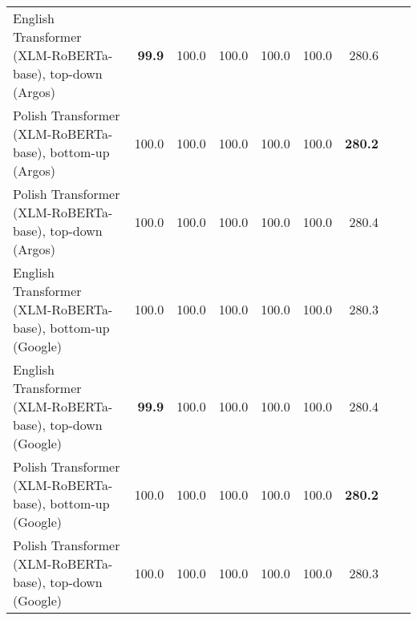 \begin{table}[ht!]
{\begin{tabular}{lrrrrrrrr}
  English Transformer (XLM-RoBERTa-base), top-down (Argos) & \textbf{99.9} & 100.0 & 100.0 & 100.0 & 100.0 & 280.6 \\ 
  Polish Transformer (XLM-RoBERTa-base), bottom-up (Argos) & 100.0 & 100.0 & 100.0 & 100.0 & 100.0 & \textbf{280.2} \\ 
  Polish Transformer (XLM-RoBERTa-base), top-down (Argos) & 100.0 & 100.0 & 100.0 & 100.0 & 100.0 & 280.4 \\ 
  English Transformer (XLM-RoBERTa-base), bottom-up (Google) & 100.0 & 100.0 & 100.0 & 100.0 & 100.0 & 280.3 \\ 
  English Transformer (XLM-RoBERTa-base), top-down (Google) & \textbf{99.9} & 100.0 & 100.0 & 100.0 & 100.0 & 280.4 \\ 
  Polish Transformer (XLM-RoBERTa-base), bottom-up (Google) & 100.0 & 100.0 & 100.0 & 100.0 & 100.0 & \textbf{280.2} \\ 
  Polish Transformer (XLM-RoBERTa-base), top-down (Google) & 100.0 & 100.0 & 100.0 & 100.0 & 100.0 & 280.3 \\ 
   \hline
\end{tabular}
}
\end{table}




